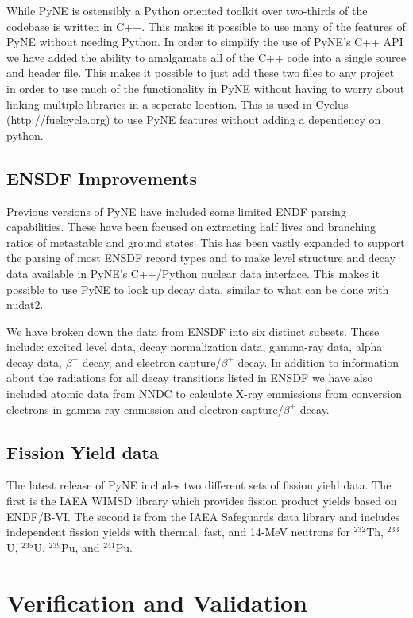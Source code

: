 \documentclass{anstrans}
\begin{document}
While PyNE is ostensibly a Python oriented toolkit over two-thirds of the codebase is written in C++. This makes it possible to use many of the features of PyNE without needing Python. In order to simplify the use of PyNE's C++ API we have added the ability to amalgamate all of the C++ code into a single source and header file. This makes it possible to just add these two files to any project in order to use much of the functionality in PyNE without having to worry about linking multiple libraries in a seperate location. This is used in Cyclus (http://fuelcycle.org) to use PyNE features without adding a dependency on python.

\subsection{ENSDF Improvements}

Previous versions of PyNE have included some limited ENDF parsing capabilities. These have been focused on extracting half lives and branching ratios of metastable and ground states. This has been vastly expanded to support the parsing of most ENSDF record types and to make level structure and decay data available in PyNE's C++/Python nuclear data interface. This makes it possible to use PyNE to look up decay data, similar to what can be done with nudat2. 

We have broken down the data from ENSDF into six distinct subsets. These include: excited level data, decay normalization data, gamma-ray data, alpha decay data, $\beta^-$ decay, and electron capture/$\beta^+$ decay. In addition to information about the radiations for all decay transitions listed in ENSDF we have also included atomic data from NNDC to calculate X-ray emmissions from conversion electrons in gamma ray emmission and electron capture/$\beta^+$ decay.

\subsection{Fission Yield data}

The latest release of PyNE includes two different sets of fission yield data. The first is the IAEA WIMSD library which provides fission product yields based on ENDF/B-VI. The second is from the IAEA Safeguards data library and includes independent fission yields with thermal, fast, and 14-MeV neutrons for $^{232}$Th, $^{233}$U, $^{235}$U, $^{239}$Pu, and $^{241}$Pu.

\section{Verification and Validation}
\end{document}
